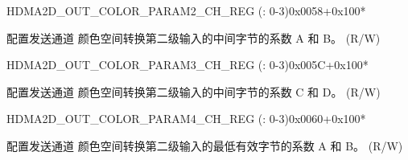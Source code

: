 \begin{register}{H}{DMA2D\_OUT\_COLOR\_PARAM2\_CH\_REG (: 0-3)}{0x0058+0x100*}\label{regdesc:DMA2DOUTCOLORPARAM2CHNREG}
%
%
\regnewline%
\begin{regdesc}\begin{reglist}
\label{fielddesc:DMA2DOUTCOLORPARAMM0CHN}\item [DMA2D\_OUT\_COLOR\_PARAM\_M0\_CH\regindex{n}] 配置发送通道  颜色空间转换第二级输入的中间字节的系数 A 和 B。 (R/W)
\end{reglist}\end{regdesc}
\end{register}


\begin{register}{H}{DMA2D\_OUT\_COLOR\_PARAM3\_CH\_REG (: 0-3)}{0x005C+0x100*}\label{regdesc:DMA2DOUTCOLORPARAM3CHNREG}
%
%
\regnewline%
\begin{regdesc}\begin{reglist}
\label{fielddesc:DMA2DOUTCOLORPARAMM1CHN}\item [DMA2D\_OUT\_COLOR\_PARAM\_M1\_CH\regindex{n}] 配置发送通道  颜色空间转换第二级输入的中间字节的系数 C 和 D。 (R/W)
\end{reglist}\end{regdesc}
\end{register}


\begin{register}{H}{DMA2D\_OUT\_COLOR\_PARAM4\_CH\_REG (: 0-3)}{0x0060+0x100*}\label{regdesc:DMA2DOUTCOLORPARAM4CHNREG}
%
%
\regnewline%
\begin{regdesc}\begin{reglist}
\label{fielddesc:DMA2DOUTCOLORPARAML0CHN}\item [DMA2D\_OUT\_COLOR\_PARAM\_L0\_CH\regindex{n}] 配置发送通道  颜色空间转换第二级输入的最低有效字节的系数 A 和 B。 (R/W)
\end{reglist}\end{regdesc}
\end{register}


